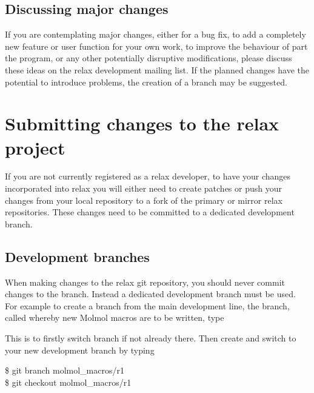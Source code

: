 \subsection{Discussing major changes}

If you are contemplating major changes, either for a bug fix, to add a completely new feature or user function for your own work, to improve the behaviour of part the program, or any other potentially disruptive modifications, please discuss these ideas on the relax development mailing list.
If the planned changes have the potential to introduce problems, the creation of a branch may be suggested.




\section{Submitting changes to the relax project}


If you are not currently registered as a relax developer, to have your changes incorporated into relax you will either need to create patches or push your changes from your local repository to a fork of the primary or mirror relax repositories.
These changes need to be committed to a dedicated development branch.


\subsection{Development branches}

When making changes to the relax git repository, you should never commit changes to the  branch.
Instead a dedicated development branch must be used.
For example to create a branch from the main development line, the  branch, called  whereby new Molmol macros are to be written, type


This is to firstly switch  branch if not already there.
Then create and switch to your new development branch by typing

\begin{exampleenv}
\$ git branch molmol\_macros/r1 \\
\$ git checkout molmol\_macros/r1
\end{exampleenv}

